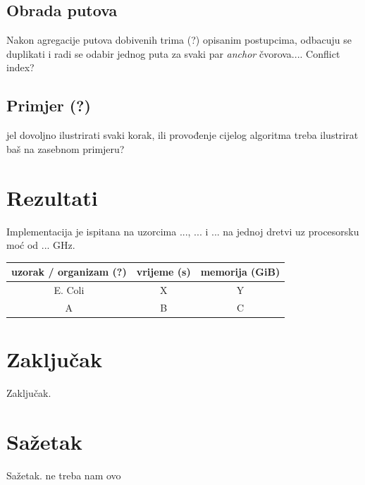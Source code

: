 \documentclass[times, utf8, seminar, numeric]{fer}
\begin{document}
\section{Obrada putova}
Nakon agregacije putova dobivenih trima (?) opisanim postupcima, odbacuju se duplikati i radi se odabir jednog puta za svaki par \textit{anchor} čvorova....
Conflict index?


\section{Primjer (?)}
jel dovoljno ilustrirati svaki korak, ili provođenje cijelog algoritma treba ilustrirat baš na zasebnom primjeru?

\chapter{Rezultati}
Implementacija je ispitana na uzorcima ..., ... i ... na jednoj dretvi uz procesorsku moć od ... GHz.

\begin{center}
\begin{tabular}{|c||c|c|}
	\hline
	uzorak / organizam (?) & vrijeme (s) & memorija (GiB)\\
	\hline
	\hline
	E. Coli & X & Y \\
	\hline
	A & B & C \\
	\hline
\end{tabular}
\end{center}
\chapter{Zaključak}
Zaključak.




\chapter{Sažetak}
Sažetak. ne treba nam ovo
\end{document}
